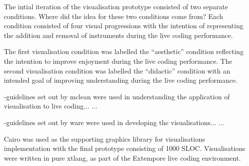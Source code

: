 The intial iteration of the visualisation prototype consisted of two separate conditions. {\color{red} Where did the idea for these two conditions come from?} Each condition consisted of four visual progressions with the intention of representing the addition and removal of instruments during the live coding performance.

The first visualisation condition was labelled the ``aesthetic'' condition reflecting the intention to improve enjoyment during the live coding performance. The second visualisation condition was labelled the ``didactic'' condition with an intended goal of improving understanding during the live coding performance.


-guidelines set out by mclean were used in understanding the application of visualisation to live coding...
\cite{McLean2010a}...

-guidelines set out by ware were used in developing the visualisations...
\cite{Ware2013a}...

Cairo was used as the supporting graphics library for visualisations implementation with the final prototype consisting of 1000 \ac{SLOC}. Visualisations were written in pure xtlang, as part of the Extempore live coding environment.

